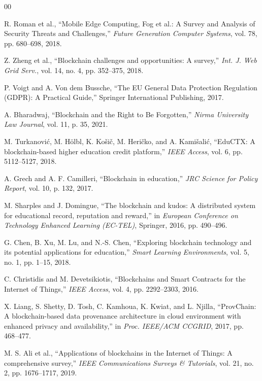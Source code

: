 \documentclass[conference]{IEEEtran}
\begin{document}
\begin{thebibliography}{00}

 R. Roman et al., ``Mobile Edge Computing, Fog et al.: A Survey and Analysis of Security Threats and Challenges,'' \textit{Future Generation Computer Systems}, vol. 78, pp. 680--698, 2018.

 Z. Zheng et al., ``Blockchain challenges and opportunities: A survey,'' \textit{Int. J. Web Grid Serv.}, vol. 14, no. 4, pp. 352--375, 2018.

 P. Voigt and A. Von dem Bussche, ``The EU General Data Protection Regulation (GDPR): A Practical Guide,'' Springer International Publishing, 2017.

 A. Bharadwaj, ``Blockchain and the Right to Be Forgotten,'' \textit{Nirma University Law Journal}, vol. 11, p. 35, 2021.

 M. Turkanovi\'{c}, M. H\"{o}lbl, K. Ko\v{s}i\v{c}, M. Heri\v{c}ko, and A. Kami\v{s}ali\'{c}, ``EduCTX: A blockchain-based higher education credit platform,'' \textit{IEEE Access}, vol. 6, pp. 5112--5127, 2018.

 A. Grech and A. F. Camilleri, ``Blockchain in education,'' \textit{JRC Science for Policy Report}, vol. 10, p. 132, 2017.

 M. Sharples and J. Domingue, ``The blockchain and kudos: A distributed system for educational record, reputation and reward,'' in \textit{European Conference on Technology Enhanced Learning (EC-TEL)}, Springer, 2016, pp. 490--496.


 G. Chen, B. Xu, M. Lu, and N.-S. Chen, ``Exploring blockchain technology and its potential applications for education,'' \textit{Smart Learning Environments}, vol. 5, no. 1, pp. 1--15, 2018.

 C. Christidis and M. Devetsikiotis, ``Blockchains and Smart Contracts for the Internet of Things,'' \textit{IEEE Access}, vol. 4, pp. 2292--2303, 2016.

 X. Liang, S. Shetty, D. Tosh, C. Kamhoua, K. Kwiat, and L. Njilla, ``ProvChain: A blockchain-based data provenance architecture in cloud environment with enhanced privacy and availability,'' in \textit{Proc. IEEE/ACM CCGRID}, 2017, pp. 468--477.

 M. S. Ali et al., ``Applications of blockchains in the Internet of Things: A comprehensive survey,'' \textit{IEEE Communications Surveys \& Tutorials}, vol. 21, no. 2, pp. 1676--1717, 2019.


\end{thebibliography}
\end{document}

